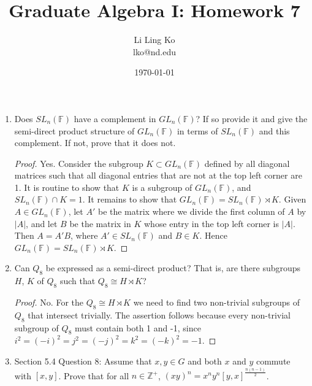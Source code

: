 \documentclass{article}
\begin{document}
\title{Graduate Algebra I: Homework 7}
\author{Li Ling Ko\\ lko@nd.edu}
\date{\today}
\maketitle

\begin{enumerate}[label={\bf Q\arabic*:}]
  \item Does $SL_n(\mathbb{F})$ have a complement in $GL_n(\mathbb{F})$? If
    so provide it and give the semi-direct product structure of
    $GL_n(\mathbb{F})$ in terms of $SL_n(\mathbb{F})$ and this complement. If
    not, prove that it does not.

    \begin{proof}
      Yes. Consider the subgroup $K\subset GL_n(\mathbb{F})$ defined by all
      diagonal matrices such that all diagonal entries that are not at the
      top left corner are 1. It is routine to show that $K$ is a subgroup
      of $GL_n(\mathbb{F})$, and $SL_n(\mathbb{F})\cap K=1$. It remains to
      show that $GL_n(\mathbb{F})=SL_n(\mathbb{F})\rtimes K$. Given $A\in
      GL_n(\mathbb{F})$, let $A'$ be the matrix where we divide the first
      column of $A$ by $|A|$, and let $B$ be the matrix in $K$ whose entry
      in the top left corner is $|A|$. Then $A=A'B$, where $A'\in
      SL_n(\mathbb{F})$ and $B\in K$. Hence
      $GL_n(\mathbb{F})=SL_n(\mathbb{F})\rtimes K$.
    \end{proof}

  \item Can $Q_8$ be expressed as a semi-direct product? That is, are there
    subgroups $H$, $K$ of $Q_8$ such that $Q_8\cong H\rtimes K$?

    \begin{proof}
      No. For the $Q_8\cong H\rtimes K$ we need to find two non-trivial
      subgroups of $Q_8$ that intersect trivially. The assertion follows
      because every non-trivial subgroup of $Q_8$ must contain both 1 and
      -1, since $i^2=(-i)^2=j^2=(-j)^2=k^2=(-k)^2=-1$.
    \end{proof}

  \item Section 5.4 Question 8: Assume that $x,y\in G$ and both $x$ and $y$
    commute with $[x,y]$. Prove that for all $n\in\mathbb{Z}^+$,
    $(xy)^n=x^ny^n[y,x]^{\frac{n(n-1)}{2}}$.



\end{enumerate}
\end{document}
